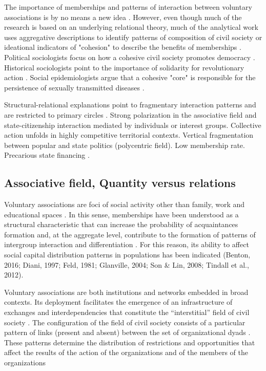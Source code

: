 The importance of memberships and patterns of interaction between voluntary associations is by no means a new idea \parencite{diani_cement_2015, sorenson_when_2014}. However, even though much of the research is based on an underlying relational theory, much of the analytical work uses aggregative descriptions to identify patterns of composition of civil society \parencite{salamon_social_1998} or ideational indicators of "cohesion" to describe the benefits of memberships \parencite{paxton_social_2002, paxton_association_2007,putnam_making_1994}. Political sociologists focus on how a cohesive civil society promotes democracy \parencite{paxton_is_1999, putnam_bowling_2000}.  Historical sociologists point to the importance of solidarity for revolutionary action \parencite{bearman_structure_1993, gould_multiple_1991}. Social epidemiologists argue that a cohesive "core" is responsible for the persistence of sexually transmitted diseases \parencite{rothenberg_personal_1996}. 
\bigskip

Structural-relational explanations point to fragmentary interaction patterns and are restricted to primary circles \parencite{castells_globalizacion_2005}. Strong polarization in the associative field and state-citizenship interaction mediated by individuals or interest groups. Collective action unfolds in highly competitive territorial contexts. Vertical fragmentation between popular and state politics (polycentric field). Low membership rate. Precarious state financing \parencite{alenda__2013}.

\subsection{Associative field, Quantity versus relations}

Voluntary associations are foci of social activity other than family, work and educational spaces \parencite{knoke_associations_1986}. In this sense, memberships have been understood as a structural characteristic that can increase the probability of acquaintances formation \parencite{mcpherson_hypernetwork_1982} and, at the aggregate level, contribute to the formation of patterns of intergroup interaction and differentiation \parencite{blau_exchange_1986}. For this reason, its ability to affect social capital distribution patterns in populations has been indicated (Benton, 2016; Diani, 1997; Feld, 1981; Glanville, 2004; Son & Lin, 2008; Tindall et al., 2012).
\bigskip

Voluntary associations are both institutions and networks embedded in broad contexts. Its deployment facilitates the emergence of an infrastructure of exchanges and interdependencies that constitute the “interstitial” field of civil society \parencite{crossley_networks_2018,diani_cement_2015,lee_when_2016}. The configuration of the field of civil society consists of a particular pattern of links (present and absent) between the set of organizational dyads \parencite{kenis_how_2002}. These patterns determine the distribution of restrictions and opportunities that affect the results of the action of the organizations and of the members of the organizations \parencite{paxton_association_2007,son_social_2008,tindall_network_2012} 
\bigskip

